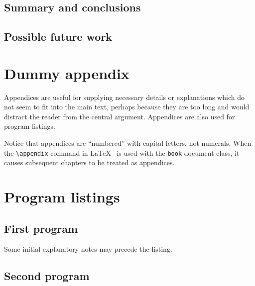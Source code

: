 \documentclass[12pt,openany,a4paper]{book}
\begin{document}
\section{Summary and conclusions}

\section{Possible future work}

\appendix


\newpage
{}
\mbox{}
\newpage



\chapter{Dummy appendix}

Appendices are useful for supplying necessary details or explanations
which do not seem to fit into the main text, perhaps because they are
too long and would distract the reader from the central argument.
Appendices are also used for program listings.

Notice that appendices are ``numbered'' with capital letters, not
numerals.  When the \verb+\appendix+ command in
\LaTeX~\cite[p.\,175]{lamport} is used with the \texttt{book} document
class, it causes subsequent chapters to be treated as appendices.

\chapter{Program listings}

\section{First program}

Some initial explanatory notes may precede the listing.

\section{Second program}
\end{document}
